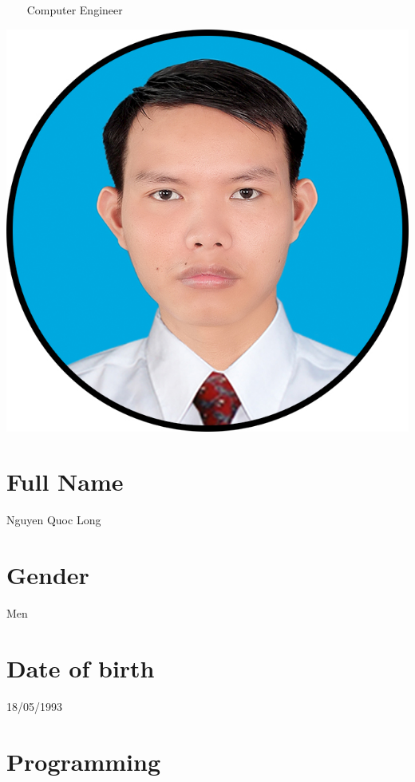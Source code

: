 \documentclass[]{friggeri-cv}
\begin{document}
~~~
      {Computer Engineer}
      
\noindent\makebox[\linewidth]{\rule{\paperwidth}{2pt}}


\begin{aside}
   \includegraphics[scale=0.8]{img/circle01.jpg}
  \section{Full Name}
Nguyen Quoc Long
  \section{Gender}
Men
  \section{Date of birth}
	18/05/1993
~
~
~
  \section{Programming}
~
~
~

\end{aside}
\end{document}

